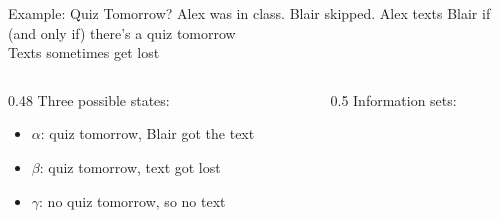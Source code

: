 \begin{frame}{Example: Quiz Tomorrow?}
Alex was in class. Blair skipped. Alex texts Blair if (and only if) there's a quiz tomorrow\\ Texts sometimes get lost
\bsk
\begin{columns}[c]
\begin{column}{0.48\textwidth}
Three possible states:
\begin{itemize}
    \item $\alpha$: quiz tomorrow, Blair got the text
    \item $\beta$: quiz tomorrow, text got lost
    \item $\gamma$: no quiz tomorrow, so no text
\end{itemize}
\end{column}
\begin{column}{0.5\textwidth}
Information sets:
\bsk
\centering
\quizparts[0.68in]{}
\end{column}
\end{columns}
\bsk
{}
\vspace{-0.3in}
\end{frame}



